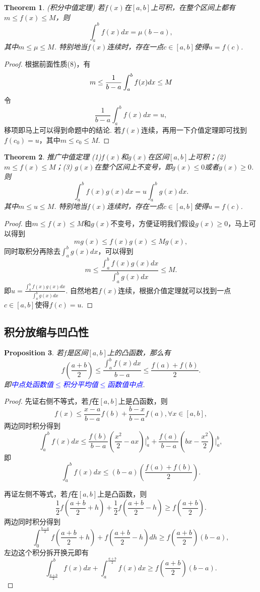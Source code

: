 \documentclass{article}
\newtheorem{theorem}{Theorem}[section]
\newtheorem{proposition}[theorem]{Proposition}
\newcommand{\bluet}[1]{\textcolor{blue}{#1}}
\begin{document}
\begin{theorem}
\rm {\color{red} (积分中值定理) } 若$f(x)$在$[a,b]$上可积，在整个区间上都有$m \leq f(x) \leq M$，则
$$
\int_a^b f(x)dx = \mu(b-a),
$$
其中$m\leq \mu \leq M$. 特别地当$f(x)$连续时，存在一点$c\in [a,b]$使得$u=f(c)$.  
\end{theorem}

\begin{proof}
根据前面性质(8)，有
$$
m \leq \frac{1}{b-a}\int_a^b f(x)dx \leq M \\
$$
令
$$
\frac{1}{b-a}\int_a^b f(x)dx = u,
$$
移项即马上可以得到命题中的结论. 若$f(x)$连续，再用一下介值定理即可找到$f(c_0) = u$，其中$m \leq c_0 \leq M$. 
\end{proof}

\begin{theorem}
\rm {\color{red} 推广中值定理} (1)$f(x)$和$g(x)$在区间$[a,b]$上可积；(2)$m\leq f(x) \leq M$；(3) $g(x)$在整个区间上不变号，即$g(x) \leq 0$或者$g(x) \geq 0$. 则
$$
\int_a^b f(x)g(x)dx = u\int_a^b g(x)dx.
$$
其中$m \leq  u \leq M$. 特别地当$f(x)$连续时，存在一点$c\in [a,b]$使得$u=f(c)$.  
\end{theorem}

\begin{proof}
由$m \leq f(x) \leq M$和$g(x)$不变号，方便证明我们假设$g(x) \geq 0$，马上可以得到
$$
mg(x) \leq f(x)g(x) \leq Mg(x),
$$
同时取积分再除去$\int_a^b g(x)dx$，可以得到
$$
m \leq \frac{\int_a^b f(x)g(x)dx}{\int_a^b g(x)dx} \leq M.
$$
即$u = \frac{\int_a^b f(x)g(x)dx}{\int_a^b g(x)dx}$. 自然地若$f(x)$连续，根据介值定理就可以找到一点$c \in [a,b]$使得$f(c) = u$.
\end{proof}

\subsection{积分放缩与凹凸性}

\begin{proposition}
\rm 若$f$是区间$[a,b]$上的凸函数，那么有
$$
f\left(\frac{a+b}{2}\right) \leq \frac{\int_a^b f(x)dx}{b-a} \leq \frac{f(a)+f(b)}{2}.
$$
即\bluet{中点处函数值$\leq$积分平均值$\leq$函数值中点}.
\end{proposition}

\begin{proof}
\rm 先证右侧不等式，若$f$在$[a,b]$上是凸函数，则
$$
f(x)\leq \frac {x-a}{b-a}f(b)+\frac {b-x}{b-a}f(a),\forall x\in [a,b],
$$
两边同时积分得到
$$
\int_a^b f(x)dx \leq \frac{f(b)}{b-a}(\frac {x^2}{2}-ax)\bigg|_a^b+\frac{f(a)}{b-a}(bx-\frac {x^2}{2})\bigg|_a^b,
$$
即
$$
\int_a^b f(x)dx \leq (b-a)\left(\frac{f(a)+f(b)}2\right).
$$

再证左侧不等式，若$f$在$[a,b]$上是凸函数，则
$$
\frac{1}{2}f\left(\frac{a+b}{2}+h\right) + \frac{1}{2}f\left(\frac{a+b}{2}-h\right) \geq f\left(\frac{a+b}{2}\right). 
$$
两边同时积分得到
$$
\int_{0}^{\frac{b-a}{2}} f\left(\frac{a+b}{2}+h\right) + f\left(\frac{a+b}{2}-h\right)dh \geq f\left(\frac{a+b}{2}\right)(b-a),
$$
左边这个积分拆开换元即有
$$
\int_{\frac{a+b}{2}}^{b}f(x)dx + \int_{a}^{\frac{a+b}{2}}f(x)dx  \geq f\left(\frac{a+b}{2}\right)(b-a). 
$$
\end{proof}
\end{document}
